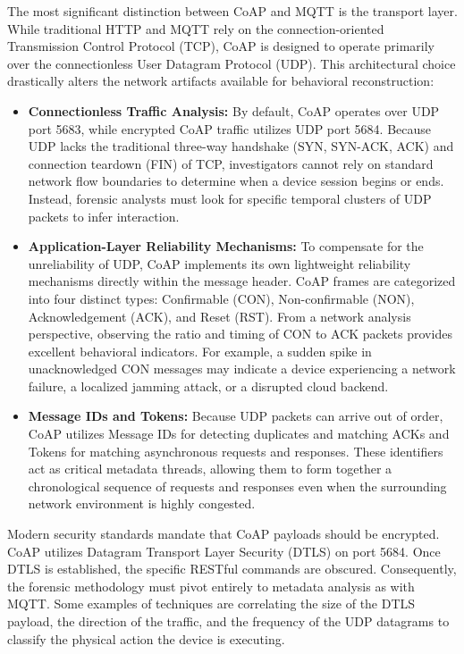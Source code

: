 The most significant distinction between CoAP and MQTT is the transport layer. While traditional HTTP and MQTT rely on the connection-oriented Transmission Control Protocol (TCP), CoAP is designed to operate primarily over the connectionless User Datagram Protocol (UDP). This architectural choice drastically alters the network artifacts available for behavioral reconstruction:

\begin{itemize}
	\item \textbf{Connectionless Traffic Analysis:} By default, CoAP operates over UDP port 5683, while encrypted CoAP traffic utilizes UDP port 5684. Because UDP lacks the traditional three-way handshake (SYN, SYN-ACK, ACK) and connection teardown (FIN) of TCP, investigators cannot rely on standard network flow boundaries to determine when a device session begins or ends. Instead, forensic analysts must look for specific temporal clusters of UDP packets to infer interaction.
	
	\item \textbf{Application-Layer Reliability Mechanisms:} To compensate for the unreliability of UDP, CoAP implements its own lightweight reliability mechanisms directly within the message header. CoAP frames are categorized into four distinct types: Confirmable (CON), Non-confirmable (NON), Acknowledgement (ACK), and Reset (RST). From a network analysis perspective, observing the ratio and timing of CON to ACK packets provides excellent behavioral indicators. For example, a sudden spike in unacknowledged CON messages may indicate a device experiencing a network failure, a localized jamming attack, or a disrupted cloud backend.
	
	\item \textbf{Message IDs and Tokens:} Because UDP packets can arrive out of order, CoAP utilizes Message IDs for detecting duplicates and matching ACKs and Tokens for matching asynchronous requests and responses. These identifiers act as critical metadata threads, allowing them to form together a chronological sequence of requests and responses even when the surrounding network environment is highly congested.
\end{itemize}

Modern security standards mandate that CoAP payloads should be encrypted. CoAP utilizes Datagram Transport Layer Security (DTLS) on port 5684. Once DTLS is established, the specific RESTful commands are obscured. Consequently, the forensic methodology must pivot entirely to metadata analysis as with MQTT. Some examples of techniques are correlating the size of the DTLS payload, the direction of the traffic, and the frequency of the UDP datagrams to classify the physical action the device is executing.

